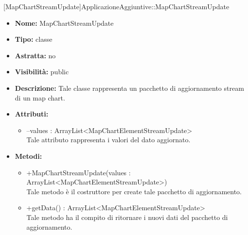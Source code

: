 			[MapChartStreamUpdate]{ApplicazioneAggiuntive::MapChartStreamUpdate}
			

	
			
			\begin{itemize}
			\item \textbf{Nome:} MapChartStreamUpdate
			\item \textbf{Tipo:} classe
			
		\item \textbf{Astratta:}
		no
			\item \textbf{Visibilità:} public
			\item \textbf{Descrizione:} Tale classe rappresenta un pacchetto di aggiornamento stream di un map chart.
			\item \textbf{Attributi:}
				\begin{itemize}
				\setlength{\itemsep}{5pt}
				
					\item[\ding{111}] {--values : ArrayList<MapChartElementStreamUpdate>} \\ [1mm] Tale attributo rappresenta i valori del dato aggiornato.
				\end{itemize}
		
			\item \textbf{Metodi:}
				\begin{itemize}
				\setlength{\itemsep}{5pt}
				
					\item[\ding{111}] {{+MapChartStreamUpdate(values : ArrayList<MapChartElementStreamUpdate>)}} \\ [1mm] Tale metodo è il costruttore per create tale pacchetto di aggiornamento.
					\item[\ding{111}] {{+getData() : ArrayList<MapChartElementStreamUpdate>}} \\ [1mm] Tale metodo ha il compito di ritornare i nuovi dati del pacchetto di aggiornamento.
				\end{itemize}
		
			\end{itemize}
	
